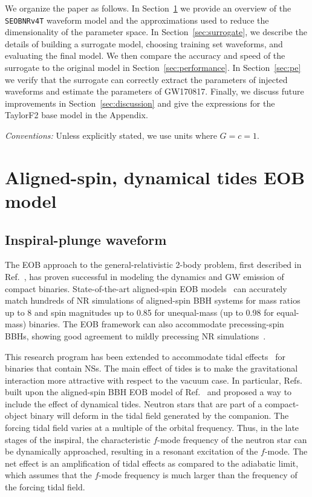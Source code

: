 \documentclass[prd,aps,letter,twocolumn,floatfix,notitlepage,nofootinbib]{revtex4-1}
\begin{document}
We organize the paper as follows. In Section~\ref{sec:eob} we provide an overview of the \texttt{SEOBNRv4T} waveform model and the approximations used to reduce the dimensionality of the parameter space. In Section~\ref{sec:surrogate}, we describe the details of building a surrogate model, choosing training set waveforms, and evaluating the final model. We then compare the accuracy and speed of the surrogate to the original model in Section~\ref{sec:performance}. In Section~\ref{sec:pe} we verify that the surrogate can correctly extract the parameters of injected waveforms and estimate the parameters of GW170817. Finally, we discuss future improvements in Section~\ref{sec:discussion} and give the expressions for the TaylorF2 base model in the Appendix.

\textit{Conventions:} Unless explicitly stated, we use units where $G=c=1$.


\section{Aligned-spin, dynamical tides EOB model}
\label{sec:eob}

\subsection{Inspiral-plunge waveform}

The EOB approach to the general-relativistic 2-body problem, first described in Ref.~\cite{Buonanno:1998gg}, has proven successful in modeling the dynamics and GW emission of compact binaries. State-of-the-art aligned-spin EOB models~\cite{Bohe:2016gbl,Nagar:2017jdw} can accurately match hundreds of NR simulations of aligned-spin BBH systems for mass ratios up to 8 and spin magnitudes up to 0.85 for unequal-mass (up to 0.98 for equal-mass) binaries. The EOB framework can also accommodate precessing-spin BBHs, showing good agreement to mildly precessing NR simulations~\cite{Babak:2016tgq}. 

This research program has been extended to accommodate tidal effects~\cite{Damour:2009wj,Vines:2010ca,Damour:2012yf,Bini:2012gu,Bernuzzi:2014owa,Hinderer:2016eia,Steinhoff:2016rfi,Dietrich:2017feu} for binaries that contain NSs. The main effect of tides is to make the gravitational interaction more attractive with respect to the vacuum case. In particular, Refs.~\cite{Hinderer:2016eia,Steinhoff:2016rfi} built upon the aligned-spin BBH EOB model of Ref.~\cite{Taracchini:2013rva} and proposed a way to include the effect of dynamical tides. Neutron stars that are part of a compact-object binary will deform in the tidal field generated by the companion. The forcing tidal field varies at a multiple of the orbital frequency. Thus, in the late stages of the inspiral, the characteristic $f$-mode frequency of the neutron star can be dynamically approached, resulting in a resonant excitation of the $f$-mode. The net effect is an amplification of tidal effects as compared to the adiabatic limit, which assumes that the $f$-mode frequency is much larger than the frequency of the forcing tidal field.
\end{document}
